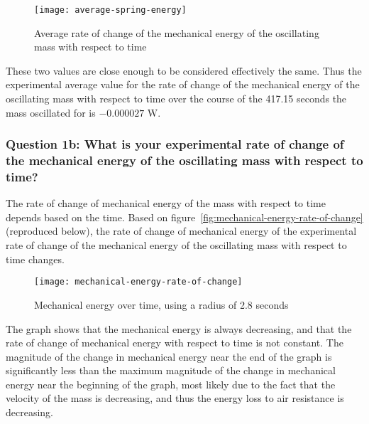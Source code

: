 \documentclass[titlepage]{article}
\begin{document}
                \begin{figure}[H]
                    \centering
                    \texttt{[image: average-spring-energy]}
                    \caption{Average rate of change of the mechanical energy of the oscillating mass with respect to time}
                    \label{fig:average-spring-energy}
                \end{figure}
                
                These two values are close enough to be considered effectively the same.
                Thus the experimental average value for the rate of change of the mechanical energy of the oscillating mass with respect to time over the course of the 417.15 seconds the mass oscillated for is $-0.000027 \text{ W}$.
            
            \subsubsection{Question 1b: What is your experimental rate of change of the mechanical energy of the oscillating mass with respect to time?}
                The rate of change of mechanical energy of the mass with respect to time depends based on the time.
                Based on figure~\ref{fig:mechanical-energy-rate-of-change} (reproduced below), the rate of change of mechanical energy of the experimental rate of change of the mechanical energy of the oscillating mass with respect to time changes.
                
                \begin{figure}[H]
                    \centering
                    \texttt{[image: mechanical-energy-rate-of-change]}
                    \caption{Mechanical energy over time, using a radius of 2.8 seconds}
                    \label{fig:mechanical-energy-rate-of-change-2}
                \end{figure}
                
                The graph shows that the mechanical energy is always decreasing, and that the rate of change of mechanical energy with respect to time is not constant.
                The magnitude of the change in mechanical energy near the end of the graph is significantly less than the maximum magnitude of the change in mechanical energy near the beginning of the graph, most likely due to the fact that the velocity of the mass is decreasing, and thus the energy loss to air resistance is decreasing.
                
\end{document}

